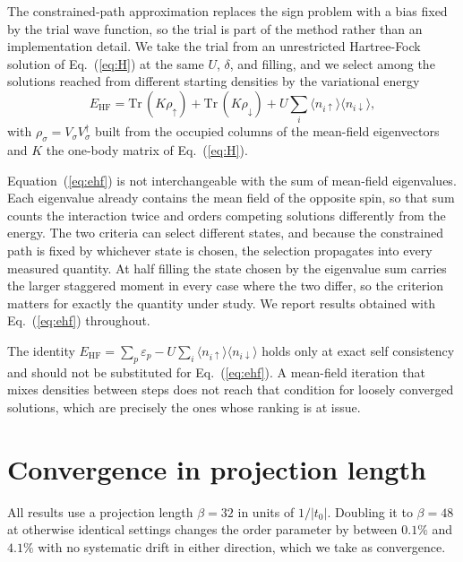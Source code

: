 \documentclass[aps,prb,reprint,superscriptaddress,amsmath,amssymb,floatfix]{revtex4-2}
\begin{document}
The constrained-path approximation replaces the sign problem with a bias fixed by
the trial wave function, so the trial is part of the method rather than an
implementation detail. We take the trial from an unrestricted Hartree-Fock
solution of Eq.~(\ref{eq:H}) at the same $U$, $\delta$, and filling, and we select
among the solutions reached from different starting densities by the variational
energy
\begin{equation}
E_{\mathrm{HF}} = \mathrm{Tr}\,(K \rho_{\uparrow}) + \mathrm{Tr}\,(K \rho_{\downarrow})
                + U \sum_i \langle n_{i\uparrow}\rangle \langle n_{i\downarrow}\rangle ,
\label{eq:ehf}
\end{equation}
with $\rho_{\sigma} = V_{\sigma} V_{\sigma}^{\dagger}$ built from the occupied
columns of the mean-field eigenvectors and $K$ the one-body matrix of
Eq.~(\ref{eq:H}).

Equation~(\ref{eq:ehf}) is not interchangeable with the sum of mean-field
eigenvalues. Each eigenvalue already contains the mean field of the opposite
spin, so that sum counts the interaction twice and orders competing solutions
differently from the energy. The two criteria can select different states, and
because the constrained path is fixed by whichever state is chosen, the selection
propagates into every measured quantity. At half filling the state chosen by the
eigenvalue sum carries the larger staggered moment in every case where the two
differ, so the criterion matters for exactly the quantity under study. We report
results obtained with Eq.~(\ref{eq:ehf}) throughout.

The identity
$E_{\mathrm{HF}} = \sum_p \varepsilon_p - U \sum_i \langle n_{i\uparrow}\rangle
\langle n_{i\downarrow}\rangle$
holds only at exact self consistency and should not be substituted for
Eq.~(\ref{eq:ehf}). A mean-field iteration that mixes densities between steps does
not reach that condition for loosely converged solutions, which are precisely the
ones whose ranking is at issue.

\section{Convergence in projection length}
\label{app:beta}

All results use a projection length $\beta = 32$ in units of $1/|t_0|$. Doubling
it to $\beta = 48$ at otherwise identical settings changes the order parameter by
between $0.1\%$ and $4.1\%$ with no systematic drift in either direction, which we
take as convergence.
\end{document}
